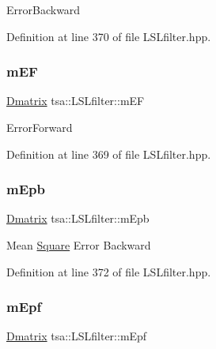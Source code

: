 Error\+Backward 

Definition at line 370 of file L\+S\+Lfilter.\+hpp.

\mbox{\label{classtsa_1_1_l_s_lfilter_a980bad9cc152c400df6f4e1e8c25c111}} 
\subsubsection{\texorpdfstring{m\+EF}{mEF}}
{\footnotesize\ttfamily \hyperlink{namespacetsa_ad260cd21c1891c4ed391fe788569aba4}{Dmatrix} tsa\+::\+L\+S\+Lfilter\+::m\+EF\hspace{0.3cm}{\ttfamily [private]}}

Error\+Forward 

Definition at line 369 of file L\+S\+Lfilter.\+hpp.

\mbox{\label{classtsa_1_1_l_s_lfilter_a067ccd52ecffc15945fdcb73fa515244}} 
\subsubsection{\texorpdfstring{m\+Epb}{mEpb}}
{\footnotesize\ttfamily \hyperlink{namespacetsa_ad260cd21c1891c4ed391fe788569aba4}{Dmatrix} tsa\+::\+L\+S\+Lfilter\+::m\+Epb\hspace{0.3cm}{\ttfamily [private]}}

Mean \hyperlink{classtsa_1_1_square}{Square} Error Backward 

Definition at line 372 of file L\+S\+Lfilter.\+hpp.

\mbox{\label{classtsa_1_1_l_s_lfilter_a571c1d1b411aad2417ce23579a8da9ac}} 
\subsubsection{\texorpdfstring{m\+Epf}{mEpf}}
{\footnotesize\ttfamily \hyperlink{namespacetsa_ad260cd21c1891c4ed391fe788569aba4}{Dmatrix} tsa\+::\+L\+S\+Lfilter\+::m\+Epf\hspace{0.3cm}{\ttfamily [private]}}

